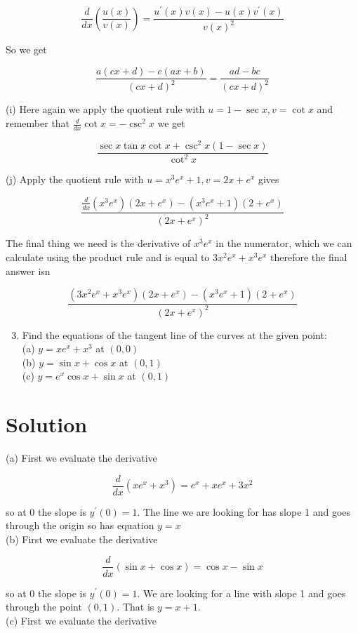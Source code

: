 \documentclass[10pt]{article}
\begin{document}
$$
\frac{d}{d x}\left(\frac{u(x)}{v(x)}\right)=\frac{u^{\prime}(x) v(x)-u(x) v^{\prime}(x)}{v(x)^{2}}
$$

So we get

$$
\frac{a(c x+d)-c(a x+b)}{(c x+d)^{2}}=\frac{a d-b c}{(c x+d)^{2}}
$$

(i) Here again we apply the quotient rule with $u=1-\sec x, v=\cot x$ and remember that $\frac{d}{d x} \cot x=-\csc ^{2} x$ we get

$$
\frac{\sec x \tan x \cot x+\csc ^{2} x(1-\sec x)}{\cot ^{2} x}
$$

(j) Apply the quotient rule with $u=x^{3} e^{x}+1, v=2 x+e^{x}$ gives

$$
\frac{\frac{d}{d x}\left(x^{3} e^{x}\right)\left(2 x+e^{x}\right)-\left(x^{3} e^{x}+1\right)\left(2+e^{x}\right)}{\left(2 x+e^{x}\right)^{2}}
$$

The final thing we need is the derivative of $x^{3} e^{x}$ in the numerator, which we can calculate using the product rule and is equal to $3 x^{2} e^{x}+x^{3} e^{x}$ therefore the final answer isn

$$
\frac{\left(3 x^{2} e^{x}+x^{3} e^{x}\right)\left(2 x+e^{x}\right)-\left(x^{3} e^{x}+1\right)\left(2+e^{x}\right)}{\left(2 x+e^{x}\right)^{2}}
$$

\begin{enumerate}
  \setcounter{enumi}{2}
  \item Find the equations of the tangent line of the curves at the given point:\\
(a) $y=x e^{x}+x^{3}$ at $(0,0)$\\
(b) $y=\sin x+\cos x$ at $(0,1)$\\
(c) $y=e^{x} \cos x+\sin x$ at $(0,1)$
\end{enumerate}

\section*{Solution}
(a) First we evaluate the derivative

$$
\frac{d}{d x}\left(x e^{x}+x^{3}\right)=e^{x}+x e^{x}+3 x^{2}
$$

so at 0 the slope is $y^{\prime}(0)=1$. The line we are looking for has slope 1 and goes through the origin so has equation $y=x$\\
(b) First we evaluate the derivative

$$
\frac{d}{d x}(\sin x+\cos x)=\cos x-\sin x
$$

so at 0 the slope is $y^{\prime}(0)=1$. We are looking for a line with slope 1 and goes through the point $(0,1)$. That is $y=x+1$.\\
(c) First we evaluate the derivative
\end{document}

